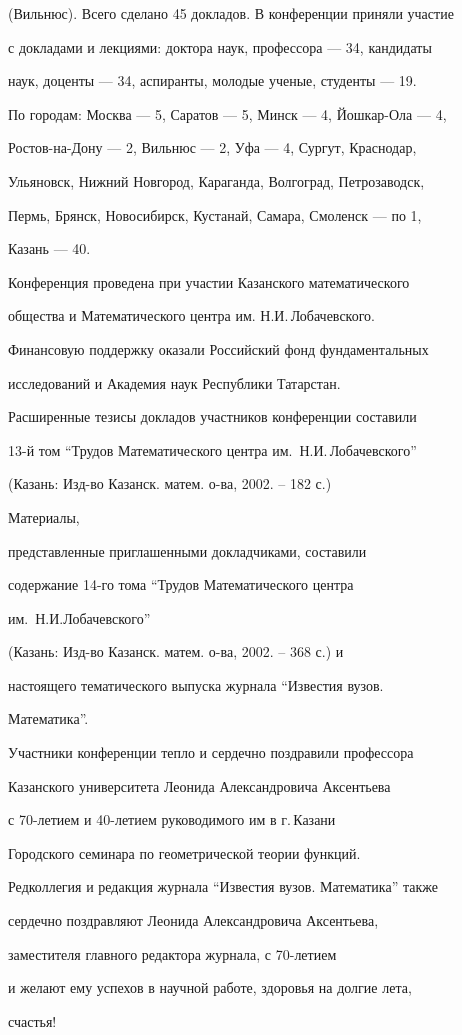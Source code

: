(Вильнюс). Всего сделано 45 докладов. В конференции приняли участие 

с докладами и лекциями: доктора наук, профессора --- 34, кандидаты 

наук, доценты --- 34, аспиранты, молодые ученые, студенты --- 19. 

По городам: Москва --- 5, Саратов --- 5, Минск --- 4, Йошкар-Ола --- 4, 

Ростов-на-Дону --- 2, Вильнюс --- 2, Уфа --- 4, Сургут, Краснодар, 

Ульяновск, Нижний Новгород, Караганда, Волгоград, Петрозаводск, 

Пермь, Брянск, Новосибирск, Кустанай, Самара, Смоленск --- по 1, 

Казань --- 40.



Конференция проведена при участии Казанского математического 

общества и Математического центра им. Н.И.\,Лобачевского.

Финансовую поддержку оказали Российский фонд фундаментальных 

исследований и Академия наук Республики Татарстан. 

Расширенные тезисы докладов участников конференции составили 

13-й том ``Трудов Математического центра им.~Н.И.\,Лобачевского''

(Казань: Изд-во Казанск. матем. о-ва, 2002. -- 182 с.)

Материалы, 

представленные приглашенными докладчиками, составили 

содержание 14-го тома ``Трудов Математического центра 

им.~Н.И.Лобачевского''

(Казань: Изд-во Казанск. матем. о-ва, 2002. -- 368 с.) и 

настоящего тематического выпуска журнала ``Известия вузов. 

Математика''.



Участники конференции тепло и сердечно поздравили профессора

Казанского университета Леонида Александровича Аксентьева

с 70-летием и 40-летием руководимого им в г.\,Казани

Городского семинара по геометрической теории функций.



Редколлегия и редакция журнала ``Известия вузов. Математика'' также

сердечно поздравляют Леонида Александровича Аксентьева,

заместителя главного редактора журнала, с 70-летием

и желают ему успехов в научной работе, здоровья на долгие лета,

счастья!

















